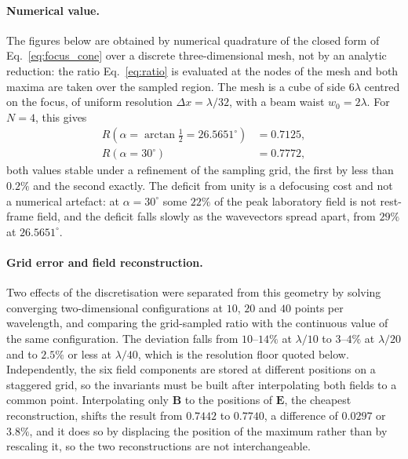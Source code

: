 \documentclass[aps,prd,reprint,superscriptaddress,nofootinbib,floatfix]{revtex4-2}
\begin{document}
\paragraph{Numerical value.} The figures below are obtained by numerical
quadrature of the closed form of Eq.~\eqref{eq:focus_cone} over a discrete
three-dimensional mesh, not by an analytic reduction: the ratio
Eq.~\eqref{eq:ratio} is evaluated at the nodes of the mesh and both maxima
are taken over the sampled region. The mesh is a cube of side $6\lambda$
centred on the focus, of uniform resolution $\Delta x=\lambda/32$, with a
beam waist $w_0=2\lambda$. For $N=4$, this gives
\begin{equation}
\begin{split}
R(\alpha=\arctan\tfrac12=26.5651^\circ)&=0.7125,\\
R(\alpha=30^\circ)&=0.7772,
\end{split}
\label{eq:Rcone}
\end{equation}
both values stable under a refinement of the sampling grid, the first by less
than $0.2\%$ and the second exactly. The deficit from unity is a defocusing
cost and not a numerical artefact: at $\alpha=30^\circ$ some $22\%$ of the
peak laboratory field is not rest-frame field, and the deficit falls slowly as
the wavevectors spread apart, from $29\%$ at $26.5651^\circ$.

\paragraph{Grid error and field reconstruction.} Two effects of the
discretisation were separated from this geometry by solving converging
two-dimensional configurations at $10$, $20$ and $40$ points per wavelength,
and comparing the grid-sampled ratio with the continuous value of the same
configuration. The deviation falls from $10$--$14\%$ at $\lambda/10$ to
$3$--$4\%$ at $\lambda/20$ and to $2.5\%$ or less at $\lambda/40$, which is
the resolution floor quoted below. Independently, the six field components are
stored at different positions on a staggered grid, so the invariants must be
built after interpolating both fields to a common point. Interpolating only
$\mathbf{B}$ to the positions of $\mathbf{E}$, the cheapest reconstruction,
shifts the result from $0.7442$ to $0.7740$, a difference of $0.0297$ or
$3.8\%$, and it does so by displacing the position of the maximum rather than
by rescaling it, so the two reconstructions are not interchangeable.
\end{document}
